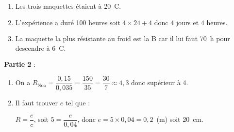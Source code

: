 
\begin{enumerate}
\item  %
Les trois maquettes étaient à 20~\degres C. 

\item %
L'expérience a duré 100 heures soit $4 \times 24 + 4$ donc 4 jours et 4 heures.

\item %
La maquette la plus résistante au froid est la B car il lui faut  70~h pour descendre à 6~\degres C.
\end{enumerate}

\medskip

\textbf{Partie 2 }: 

%
%

\medskip

\begin{enumerate}
\item  %

On a $R_{\text{Noa}} = \dfrac{0,15}{0,035} = \dfrac{150}{35} = \dfrac{30}{7} \approx 4,3$ donc supérieur à 4.
\item  %

Il faut trouver $e$ tel que :

$R = \dfrac{e}{c}$, soit $5 = \dfrac{e}{0,04}$, donc $e = 5 \times 0,04 = 0,2$~(m) soit 20~cm.
\end{enumerate}

\bigskip

